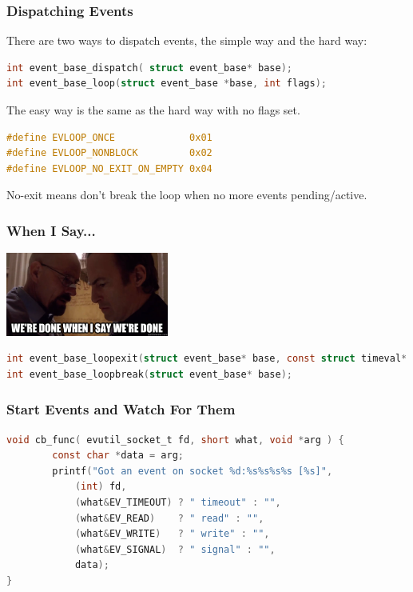 \begin{frame}[fragile]
	\frametitle{Dispatching Events}

	There are two ways to dispatch events, the simple way and the hard way:
	\begin{lstlisting}[language=C]
int event_base_dispatch( struct event_base* base);
int event_base_loop(struct event_base *base, int flags);
\end{lstlisting}

	The easy way is the same as the hard way with no flags set.

	\begin{lstlisting}[language=C]
#define EVLOOP_ONCE             0x01
#define EVLOOP_NONBLOCK         0x02
#define EVLOOP_NO_EXIT_ON_EMPTY 0x04
\end{lstlisting}

	No-exit means don't break the loop when no more events pending/active.

\end{frame}


\begin{frame}[fragile]
	\frametitle{When I Say...}

	\begin{center}
		\includegraphics[width=0.4\textwidth]{images/whenisay.jpg}
	\end{center}

	\begin{lstlisting}[language=C]
int event_base_loopexit(struct event_base* base, const struct timeval* tv);
int event_base_loopbreak(struct event_base* base);
\end{lstlisting}


\end{frame}


\begin{frame}[fragile]
	\frametitle{Start Events and Watch For Them}

	\begin{lstlisting}[language=C]
void cb_func( evutil_socket_t fd, short what, void *arg ) {
        const char *data = arg;
        printf("Got an event on socket %d:%s%s%s%s [%s]",
            (int) fd,
            (what&EV_TIMEOUT) ? " timeout" : "",
            (what&EV_READ)    ? " read" : "",
            (what&EV_WRITE)   ? " write" : "",
            (what&EV_SIGNAL)  ? " signal" : "",
            data);
}
\end{lstlisting}
\end{frame}

